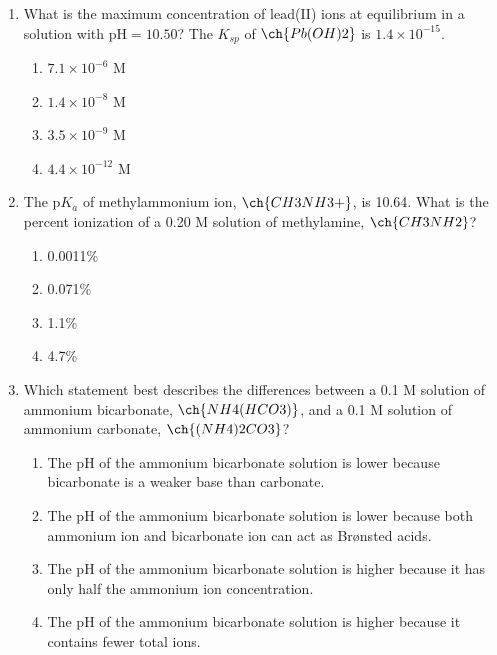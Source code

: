 \documentclass[twocolumn,10pt]{article}
\begin{document}
\begin{enumerate}[label=\arabic*., leftmargin=*]
\item What is the maximum concentration of lead(II) ions at equilibrium in a solution with $\text{pH} = 10.50$? The $K_{sp}$ of $\ch{Pb(OH)2}$ is $1.4 \times 10^{-15}$.
\begin{enumerate}[label=(\Alph*)]
    \item $7.1 \times 10^{-6}\text{ M}$ \item $1.4 \times 10^{-8}\text{ M}$ \item $3.5 \times 10^{-9}\text{ M}$ \item $4.4 \times 10^{-12}\text{ M}$
\end{enumerate}

\item The $\text{p}K_a$ of methylammonium ion, $\ch{CH3NH3+}$, is 10.64. What is the percent ionization of a 0.20 M solution of methylamine, $\ch{CH3NH2}$?
\begin{enumerate}[label=(\Alph*)]
    \item 0.0011\% \item 0.071\% \item 1.1\% \item 4.7\%
\end{enumerate}

\item Which statement best describes the differences between a 0.1 M solution of ammonium bicarbonate, $\ch{NH4(HCO3)}$, and a 0.1 M solution of ammonium carbonate, $\ch{(NH4)2CO3}$?
\begin{enumerate}[label=(\Alph*)]
    \item The pH of the ammonium bicarbonate solution is lower because bicarbonate is a weaker base than carbonate.
    \item The pH of the ammonium bicarbonate solution is lower because both ammonium ion and bicarbonate ion can act as Brønsted acids.
    \item The pH of the ammonium bicarbonate solution is higher because it has only half the ammonium ion concentration.
    \item The pH of the ammonium bicarbonate solution is higher because it contains fewer total ions.
\end{enumerate}


\end{enumerate}
\end{document}
